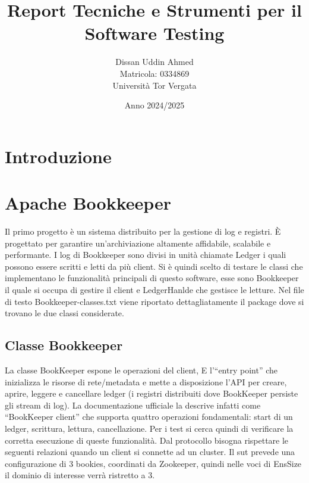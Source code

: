 \documentclass[10pt]{article}
\title{Report Tecniche e Strumenti per il\\
	Software Testing}
\author{Dissan Uddin Ahmed \\ Matricola: 0334869 \\ Università Tor Vergata}
\date{Anno 2024/2025}
\begin{document}
	
	\maketitle
	\thispagestyle{empty} %
	
	\newpage %
	
	\tableofcontents
	\newpage %
	\fontsize{10}{10}
	\section{Introduzione}
	\section{Apache Bookkeeper}
	Il primo progetto è un sistema distribuito per la gestione di log e registri. È progettato per garantire un’archiviazione altamente affidabile, scalabile e performante. I log di Bookkeeper sono divisi in unità chiamate Ledger i quali possono essere scritti e letti da più client. Si è quindi scelto di testare le classi che implementano le funzionalità principali di questo software, esse sono Bookkeeper il quale si occupa di gestire il client e LedgerHanlde che gestisce le letture. Nel file di testo Bookkeeper-classes.txt viene riportato dettagliatamente il package dove si trovano le due classi considerate.
	\subsection{Classe Bookkeeper}
	La classe BookKeeper espone le operazioni del client, E l’“entry point” che inizializza le risorse di rete/metadata e mette a disposizione l’API per creare, aprire, leggere e cancellare ledger (i registri distribuiti dove BookKeeper persiste gli stream di log). La documentazione ufficiale la descrive infatti come “BookKeeper client” che supporta quattro operazioni fondamentali: start di un ledger, scrittura, lettura, cancellazione. Per i test si cerca quindi di verificare la corretta esecuzione di queste funzionalità. Dal protocollo bisogna rispettare le seguenti relazioni quando un client si connette ad un cluster. Il sut prevede una configurazione di 3 bookies, coordinati da Zookeeper, quindi nelle voci di EnsSize il dominio di interesse verrà ristretto a 3.
\end{document}

